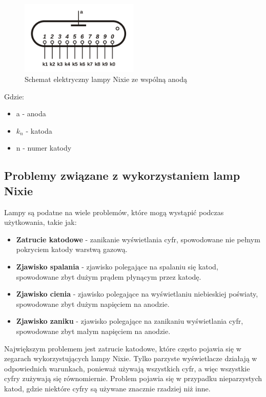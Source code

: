 \documentclass[../main.tex]{subfiles}
\begin{document}
\begin{figure}[H]
  \centering
  \includegraphics[width=0.5\textwidth]{Nixie_schematic.png}
  \caption{Schemat elektryczny lampy Nixie ze wspólną anodą \cite{st:nixie-jpg}}
  \label{fig:nixie_schematic}
\end{figure}

Gdzie:
\begin{itemize}
  \item a - anoda
  \item $k_{n}$ - katoda
  \item n - numer katody
\end{itemize}
\subsection{Problemy związane z wykorzystaniem lamp Nixie}

Lampy są podatne na wiele problemów, które mogą wystąpić podczas użytkowania, takie jak:
\begin{itemize}
  \item \textbf{Zatrucie katodowe} - zanikanie wyświetlania cyfr, spowodowane nie pełnym pokryciem katody warstwą gazową.
  \item \textbf{Zjawisko spalania} - zjawisko polegające na spalaniu się katod, spowodowane zbyt dużym prądem płynącym przez katodę.
  \item \textbf{Zjawisko cienia} - zjawisko polegające na wyświetlaniu niebieskiej poświaty, spowodowane zbyt dużym napięciem na anodzie.
  \item \textbf{Zjawisko zaniku} - zjawisko polegające na zanikaniu wyświetlania cyfr, spowodowane zbyt małym napięciem na anodzie.
\end{itemize}

Największym problemem jest zatrucie katodowe, które często pojawia się w zegarach wykorzystujących lampy Nixie.
Tylko parzyste wyświetlacze działają w odpowiednich warunkach, ponieważ używają wszystkich cyfr, 
a więc wszystkie cyfry zużywają się równomiernie.
Problem pojawia się w przypadku nieparzystych katod, gdzie niektóre cyfry są używane znacznie rzadziej niż inne.
\end{document}
